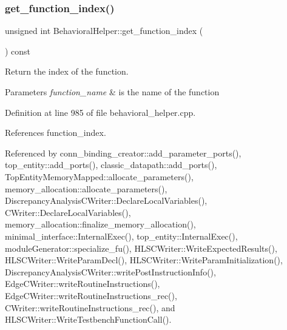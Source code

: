 \subsubsection{\texorpdfstring{get\+\_\+function\+\_\+index()}{get\_function\_index()}}
{\footnotesize\ttfamily unsigned int Behavioral\+Helper\+::get\+\_\+function\+\_\+index (\begin{DoxyParamCaption}{ }\end{DoxyParamCaption}) const}



Return the index of the function. 


\begin{DoxyParams}{Parameters}
{\em function\+\_\+name} & is the name of the function \\
\hline
\end{DoxyParams}


Definition at line 985 of file behavioral\+\_\+helper.\+cpp.



References function\+\_\+index.



Referenced by conn\+\_\+binding\+\_\+creator\+::add\+\_\+parameter\+\_\+ports(), top\+\_\+entity\+::add\+\_\+ports(), classic\+\_\+datapath\+::add\+\_\+ports(), Top\+Entity\+Memory\+Mapped\+::allocate\+\_\+parameters(), memory\+\_\+allocation\+::allocate\+\_\+parameters(), Discrepancy\+Analysis\+C\+Writer\+::\+Declare\+Local\+Variables(), C\+Writer\+::\+Declare\+Local\+Variables(), memory\+\_\+allocation\+::finalize\+\_\+memory\+\_\+allocation(), minimal\+\_\+interface\+::\+Internal\+Exec(), top\+\_\+entity\+::\+Internal\+Exec(), module\+Generator\+::specialize\+\_\+fu(), H\+L\+S\+C\+Writer\+::\+Write\+Expected\+Results(), H\+L\+S\+C\+Writer\+::\+Write\+Param\+Decl(), H\+L\+S\+C\+Writer\+::\+Write\+Param\+Initialization(), Discrepancy\+Analysis\+C\+Writer\+::write\+Post\+Instruction\+Info(), Edge\+C\+Writer\+::write\+Routine\+Instructions(), Edge\+C\+Writer\+::write\+Routine\+Instructions\+\_\+rec(), C\+Writer\+::write\+Routine\+Instructions\+\_\+rec(), and H\+L\+S\+C\+Writer\+::\+Write\+Testbench\+Function\+Call().

